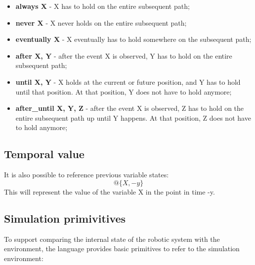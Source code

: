\begin{itemize}
\item {\bfseries always X} - X has to hold on the entire subsequent path;
\item {\bfseries never X} - X never holds on the entire subsequent path;
\item {\bfseries eventually X} - X eventually has to hold somewhere on the subsequent path;
\item {\bfseries after X, Y} - after the event X is observed, Y has to hold on the entire subsequent path;
\item {\bfseries until X, Y} - X holds at the current or future position, and Y has to hold until that position. At that position, Y does not have to hold anymore;
\item {\bfseries after\_until X, Y, Z} - after the event X is observed, Z has to hold on the entire subsequent path up until Y happens. At that position, Z does not have to hold anymore;
\end{itemize}


\subsection{Temporal value}
\label{ssec:tempvalues}

It is also possible to reference previous variable states:
\begin{equation}
@\{X, -y\}
\end{equation}
This will represent the value of the variable X in the point in time -y.


\subsection{Simulation primivitives}
\label{ssec:simprimitives}

To support comparing the internal state of the robotic system with the environment, the language provides basic primitives to refer to the simulation environment:

